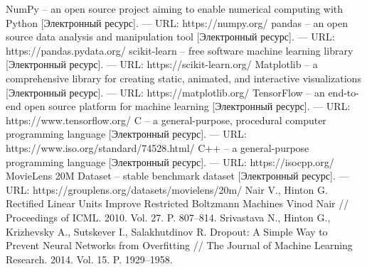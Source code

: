 \documentclass[a4paper,article,14pt]{extarticle}
\begin{document}
\begin{thebibliography}{1}
 NumPy -- an open source project aiming to enable numerical computing with Python [Электронный ресурс]. — URL: https://numpy.org/
 pandas -- an open source data analysis and manipulation tool [Электронный ресурс]. — URL: https://pandas.pydata.org/
 scikit-learn -- free software machine learning library [Электронный ресурс]. — URL: https://scikit-learn.org/
 Matplotlib -- a comprehensive library for creating static, animated, and interactive visualizations [Электронный ресурс]. — URL: https://matplotlib.org/
 TensorFlow -- an end-to-end open source platform for machine learning [Электронный ресурс]. — URL: https://www.tensorflow.org/
 C -- a general-purpose, procedural computer programming language [Электронный ресурс]. — URL: https://www.iso.org/standard/74528.html/
 C++ -- a general-purpose programming language [Электронный ресурс]. — URL: https://isocpp.org/
 MovieLens 20M Dataset -- stable benchmark dataset [Электронный ресурс]. — URL: https://grouplens.org/datasets/movielens/20m/
 Nair V., Hinton G. Rectified Linear Units Improve Restricted Boltzmann Machines Vinod Nair // Proceedings of ICML. 2010. Vol. 27. P. 807--814.
 Srivastava N., Hinton G., Krizhevsky A., Sutskever I., Salakhutdinov R. Dropout: A Simple Way to Prevent Neural Networks from Overfitting // The Journal of Machine Learning Research. 2014. Vol. 15. P. 1929--1958.
\end{thebibliography}
\end{document}
